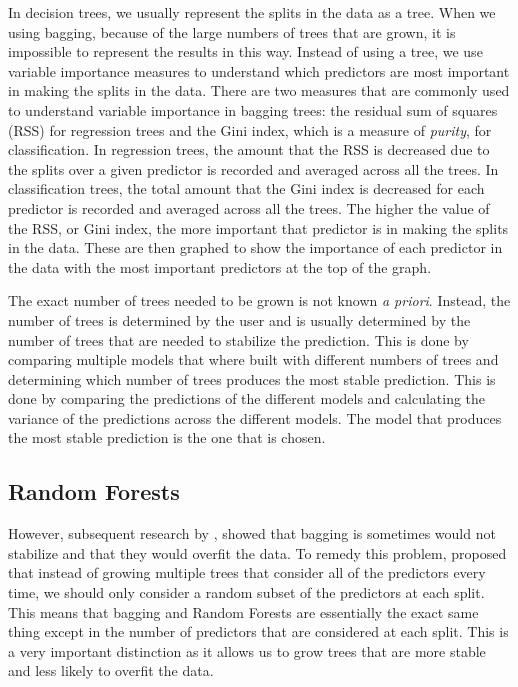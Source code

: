 In decision trees, we usually represent the splits in the data as a tree. When we using bagging, because of the large numbers of trees that are grown, it is impossible to represent the results in this way. Instead of using a tree, we use variable importance measures to understand which predictors are most important in making the splits in the data. There are two measures that are commonly used to understand variable importance in bagging trees: the residual sum of squares (RSS) for regression trees and the Gini index, which is a measure of \textit{purity}, for classification. In regression trees, the amount that the RSS is decreased due to the splits over a given predictor is recorded and averaged across all the trees. In classification trees, the total amount that the Gini index is decreased for each predictor is recorded and averaged across all the trees. The higher the value of the RSS, or Gini index, the more important that predictor is in making the splits in the data. These are then graphed to show the importance of each predictor in the data with the most important predictors at the top of the graph.

The exact number of trees needed to be grown is not known \textit{a priori}. Instead, the number of trees is determined by the user and is usually determined by the number of trees that are needed to stabilize the prediction. This is done by comparing multiple models that where built with different numbers of trees and determining which number of trees produces the most stable prediction. This is done by comparing the predictions of the different models and calculating the variance of the predictions across the different models. The model that produces the most stable prediction is the one that is chosen.

\subsection{Random Forests} \label{sec:random_forests}

However, subsequent research by \citet{breimanRandomForests2001}, showed that bagging is sometimes would not stabilize and that they would overfit the data. To remedy this problem, \citeauthor{breimanRandomForests2001} proposed that instead of growing multiple trees that consider all of the predictors every time, we should only consider a random subset of the predictors at each split. This means that bagging and Random Forests are essentially the exact same thing except in the number of predictors that are considered at each split. This is a very important distinction as it allows us to grow trees that are more stable and less likely to overfit the data. 

